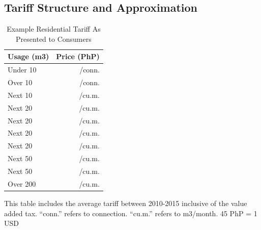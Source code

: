 \documentclass[12pt,table]{article}
\begin{document}
\pagebreak

\subsection{Tariff Structure and Approximation}\label{appendix:tariff}



\begin{table}
\centering
\caption{Example Residential Tariff As Presented to Consumers}\label{table:tarifftrue}
\begin{threeparttable}
\begin{tabular}{l*{1}{r}}
\toprule
Usage (m3) & Price (PhP) \\
\midrule
Under   10    &   /conn. \\
Over    10    &   /conn. \\
Next    10    &   /cu.m. \\
Next    20    &   /cu.m. \\
Next    20    &   /cu.m. \\
Next    20    &   /cu.m. \\
Next    20    &   /cu.m. \\
Next    50    &   /cu.m. \\
Next    50    &   /cu.m. \\
Over   200    &   /cu.m. \\
\bottomrule
\end{tabular}
\begin{tablenotes}
\item 
\footnotesize
This table includes the average tariff between 2010-2015 inclusive of the value added tax. ``conn.'' refers to connection. ``cu.m.'' refers to m3/month.   45 PhP = 1 USD
\end{tablenotes}
\end{threeparttable}
\end{table}
\end{document}
